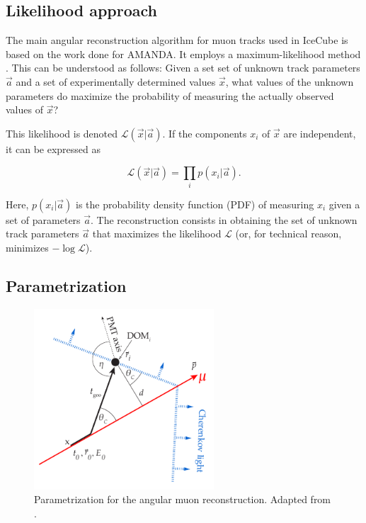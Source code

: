 \documentclass[
    a4paper, %
    fontsize=10pt, %
    twoside=false, %
    numbers=noenddot, %
    fontmethod=tex,
]{kaobook}
\begin{document}
\subsection{Likelihood approach}
The main angular reconstruction algorithm for muon tracks used in IceCube is based on the work done for AMANDA. It employs a maximum-likelihood method . This can be understood as follows: Given a set set of unknown track parameters $\vec{a}$ and a set of experimentally determined values $\vec{x}$, what values of the unknown parameters do maximize the probability of measuring the actually observed values of $\vec{x}$?

This likelihood is denoted $\mathcal{L}(\vec{x}|\vec{a})$. If the components $x_i$ of $\vec{x}$ are independent, it can be expressed as

\begin{equation}
\mathcal{L}(\vec{x}|\vec{a}) = \prod_i p(x_i|\vec{a}).
\end{equation}

Here, $p(x_i|\vec{a})$ is the probability density function (PDF) of measuring $x_i$ given a set of parameters $\vec{a}$. The reconstruction consists in obtaining the set of unknown track parameters $\vec{a}$ that maximizes the likelihood $\mathcal{L}$ (or, for technical reason, minimizes $-\log{\mathcal{L}}$).


\subsection{Parametrization}
\begin{figure}[h!]
    \includegraphics[width=0.6\textwidth]{ic/amanda_reco.pdf}
    \caption[Angular reconstruction in IceCube]{Parametrization for the angular muon reconstruction. Adapted from \cite{Ahrens2004}.}
\end{figure}
\end{document}
